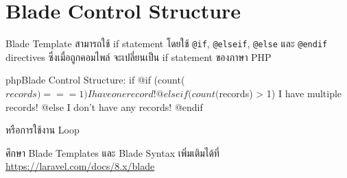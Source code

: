 \newpage

\section{Blade Control Structure}
Blade Template สามารถใช้ if statement โดยใช้ \texttt{@if}, \texttt{@elseif}, \texttt{@else} และ \texttt{@endif} directives ซึ่งเมื่อถูกคอมไพล์ จะเปลี่ยนเป็น if statement ของภาษา PHP

\begin{code}{php}{Blade Control Structure: if}{}
    @if (count($records) === 1)
        I have one record!
    @elseif (count($records) > 1)
        I have multiple records!
    @else
        I don't have any records!
    @endif
\end{code}

หรือการใช้งาน Loop


ศึกษา Blade Templates และ Blade Syntax เพิ่มเติมได้ที่ \\
\href{https://laravel.com/docs/8.x/blade}{https://laravel.com/docs/8.x/blade}